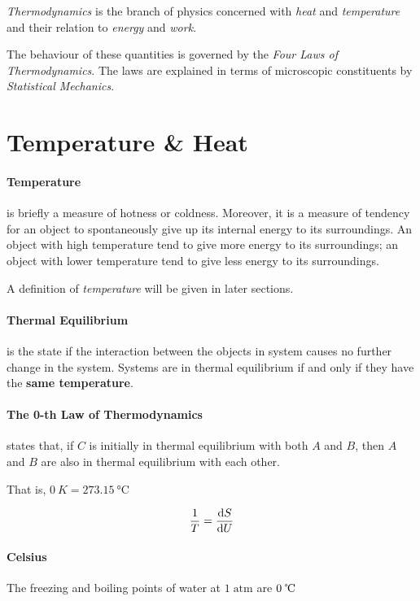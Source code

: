 \documentclass{note}
\begin{document}
\textit{Thermodynamics} is the branch of physics concerned with \textit{heat} and \textit{temperature} and their relation to \textit{energy} and \textit{work}.

The behaviour of these quantities is governed by the \textit{Four Laws of Thermodynamics}. The laws are explained in terms of microscopic constituents by \textit{Statistical Mechanics}.

\section{Temperature \& Heat}

\paragraph{Temperature} is briefly a measure of hotness or coldness. Moreover, it is a measure of tendency for an object to spontaneously give up its internal energy to its surroundings. An object with high temperature tend to give more energy to its surroundings; an object with lower temperature tend to give less energy to its surroundings.

\begin{tip}
    A definition of \textit{temperature} will be given in later sections.
\end{tip}

\paragraph{Thermal Equilibrium} is the state if the interaction between the objects in system causes no further change in the system. Systems are in thermal equilibrium if and only if they have the \textbf{same temperature}.

\paragraph{The 0-th Law of Thermodynamics} states that, if $C$ is initially in thermal equilibrium with both $A$ and $B$, then $A$ and $B$ are also in thermal equilibrium with each other.

That is, $\qty{0}{K} = \qty{273.15}{\degreeCelsius}$

\[
  \frac{1}{T} = \dv{S}{U}
\]

\paragraph{Celsius}
The freezing and boiling points of water at \(1 \;\text{atm}\) are \(0 \;\celsius\)
\end{document}
